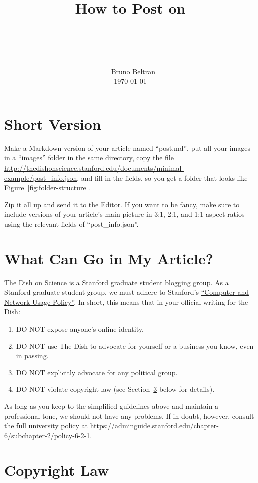 \documentclass[paper=a4, fontsize=11pt]{scrartcl}
\title{\
        \usefont{OT1}{bch}{b}{n}
        \horrule{0.5pt} \\[0.4cm]
        \huge How to Post on \\ \dishurl{} \\
        \horrule{2pt} \\[0.5cm]
}
\author{\
        \normalfont{}                     \normalsize
        Bruno Beltran\\[-3pt]             \normalsize
        \today
}
\date{}
\numberwithin{equation}{section}        %
\numberwithin{figure}{section}            %
\numberwithin{table}{section}                %
\newcommand{\dishurlplain}[1]{http://thedishonscience.stanford.edu/#1}
\newcommand{\dishurl}[1]{\url{\dishurlplain{#1}}}
\begin{document}
\maketitle

\section{Short Version}
Make a Markdown version of your article named ``post.md'', put all your images
in a ``images'' folder in the same directory, copy the file
\dishurl{documents/minimal-example/post\_info.json}, and fill in the fields, so
you get a folder that looks like Figure~\ref{fig:folder-structure}.

Zip it all up and send it to the Editor. If you want to be fancy, make sure to
include versions of your article's main picture in 3:1, 2:1, and 1:1 aspect
ratios using the relevant fields of ``post\_info.json''.

\section{What Can Go in My Article?}
The Dish on Science is a Stanford graduate student blogging group.
As a Stanford graduate student group, we must adhere to Stanford's
\href{https://adminguide.stanford.edu/chapter-6/subchapter-2/policy-6-2-1}{``Computer
and Network Usage Policy''}. In short, this means that in your official writing
for the Dish:\@
\begin{enumerate}
    \item DO NOT expose anyone's online identity.
    \item DO NOT use The Dish to advocate for yourself or a business you know,
        even in passing.
    \item DO NOT explicitly advocate for any political group.
    \item DO NOT violate copyright law (see
        Section~\ref{sec:copyright} below for details).
\end{enumerate}

As long as you keep to the simplified guidelines above and maintain a
professional tone, we should not have any problems. If in doubt, however,
consult the full university policy at
\url{https://adminguide.stanford.edu/chapter-6/subchapter-2/policy-6-2-1}.

\section{Copyright Law}\label{sec:copyright}
\end{document}
